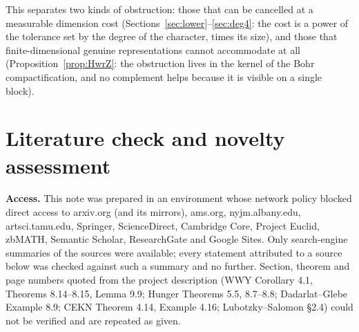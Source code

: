\documentclass[11pt]{amsart}
\theoremstyle{definition}
\theoremstyle{remark}
\begin{document}
This separates two kinds of obstruction: those that can be cancelled at a measurable dimension cost (Sections~\ref{sec:lower}--\ref{sec:deg4}: the cost is a power of the tolerance set by the degree of the character, times its size), and those that finite-dimensional genuine representations cannot accommodate at all (Proposition~\ref{prop:HwrZ}: the obstruction lives in the kernel of the Bohr compactification, and no complement helps because it is visible on a single block).

\section{Literature check and novelty assessment}\label{sec:lit}

\textbf{Access.} This note was prepared in an environment whose network policy blocked direct access to arxiv.org (and its mirrors), ams.org, nyjm.albany.edu, artsci.tamu.edu, Springer, ScienceDirect, Cambridge Core, Project Euclid, zbMATH, Semantic Scholar, ResearchGate and Google Sites. Only search-engine summaries of the sources were available; every statement attributed to a source below was checked against such a summary and no further. Section, theorem and page numbers quoted from the project description (WWY Corollary 4.1, Theorems 8.14--8.15, Lemma 9.9; Hunger Theorems 5.5, 8.7--8.8; Dadarlat--Glebe Example 8.9; CEKN Theorem 4.14, Example 4.16; Lubotzky--Salomon \S2.4) could not be verified and are repeated as given.
\end{document}
